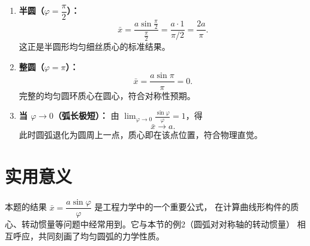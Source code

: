 \documentclass[12pt,a4paper]{ctexart}
\theoremstyle{myremark}
\begin{document}
\begin{enumerate}[leftmargin=*]

  \item \textbf{半圆（$\varphi = \dfrac{\pi}{2}$）：}
  \[
  \bar{x} = \frac{a \sin\frac{\pi}{2}}{\frac{\pi}{2}} = \frac{a \cdot 1}{\pi/2} = \frac{2a}{\pi}.
  \]
  这正是半圆形均匀细丝质心的标准结果。

  \item \textbf{整圆（$\varphi = \pi$）：}
  \[
  \bar{x} = \frac{a \sin\pi}{\pi} = 0.
  \]
  完整的均匀圆环质心在圆心，符合对称性预期。

  \item \textbf{当 $\varphi \to 0$（弧长极短）：}
  由 $\displaystyle \lim_{\varphi \to 0} \frac{\sin\varphi}{\varphi} = 1$，得
  \[
  \bar{x} \to a.
  \]
  此时圆弧退化为圆周上一点，质心即在该点位置，符合物理直觉。

\end{enumerate}

\section*{实用意义}

本题的结果 $\bar{x} = \dfrac{a\sin\varphi}{\varphi}$ 是工程力学中的一个重要公式，
在计算曲线形构件的质心、转动惯量等问题中经常用到。它与本节的例2（圆弧对对称轴的转动惯量）
相互呼应，共同刻画了均匀圆弧的力学性质。
\end{document}
